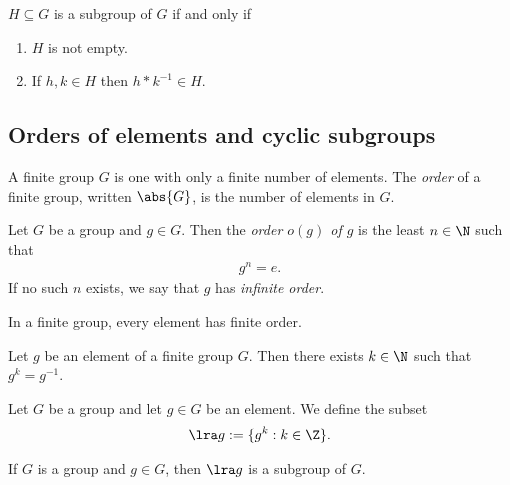 \documentclass{article}
\begin{document}
\begin{theorem}
    $H\subseteq G$ is a subgroup of $G$ if and only if
    \begin{enumerate}[label=$\widetilde{\text{S\arabic*}}$.]
        \item $H$ is not empty.
        \item If $h,k\in H$ then $h*k^{-1}\in H$.
    \end{enumerate}
\end{theorem}

\subsection{Orders of elements and cyclic subgroups}

\setcounter{theorem}{2}
\begin{definition}
    A finite group $G$ is one with only a finite number of elements.
    The \emph{order} of a finite group, written $\abs{G}$, is the
    number of elements in $G$.
\end{definition}

\begin{definition}
    Let $G$ be a group and $g\in G$. Then the \emph{order $o(g)$ of $g$}
    is the least $n\in\N$ such that
    \begin{align*}
        g^n = e.
    \end{align*}
    If no such $n$ exists, we say that $g$ has \emph{infinite order}.
\end{definition}

\setcounter{theorem}{5}
\begin{theorem}
    In a finite group, every element has finite order.
\end{theorem}

\begin{corollary}
    Let $g$ be an element of a finite group $G$. Then there exists $k\in\N$
    such that $g^k=g^{-1}$.
\end{corollary}

\begin{definition}
    Let $G$ be a group and let $g\in G$ be an element. We define the
    subset
    \begin{align*}
        \lra g := \{g^k : k\in\Z\}.
    \end{align*}
\end{definition}

\begin{lemma}
    If $G$ is a group and $g\in G$, then $\lra g$ is a subgroup of $G$.
\end{lemma}
\end{document}
